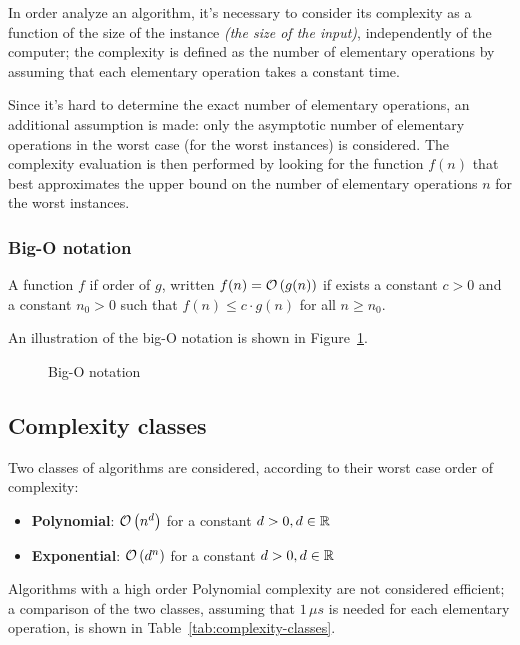 \documentclass[english]{article}
\begin{document}
In order analyze an algorithm, it's necessary to consider its complexity as a function of the size of the instance \textit{(the size of the input)}, independently of the computer;
the complexity is defined as the number of elementary operations by assuming that each elementary operation takes a constant time.

Since it's hard to determine the exact number of elementary operations, an additional assumption is made: only the asymptotic number of elementary operations in the worst case (for the worst instances) is considered.
The complexity evaluation is then performed by looking for the function \(f(n)\) that best approximates the upper bound on the number of elementary operations \(n\) for the worst instances.

\subsubsection{Big-O notation}

A function \(f\) if order of \(g\), written \(f(n) = \mathcal{O}\left(g(n)\right)\) if exists a constant \(c > 0\) and a constant \(n_0 > 0\) such that \(f(n) \leq c \cdot g(n)\) for all \(n \geq n_0\).

An illustration of the big-O notation is shown in Figure~\ref{fig:big-o-notation}.

\begin{figure}[htbp]
  \bigskip
  \centering
  \caption{Big-O notation}
  \label{fig:big-o-notation}
  \bigskip
\end{figure}

\subsection{Complexity classes}

Two classes of algorithms are considered, according to their worst case order of complexity:

\begin{itemize}
  \item \textbf{Polynomial}: \(\mathcal{O}\left(n^d\right)\) for a constant \(d > 0, d \in \mathbb{R}\)
  \item \textbf{Exponential}: \(\mathcal{O}\left(d^n\right)\) for a constant \(d > 0, d \in \mathbb{R}\)
\end{itemize}

Algorithms with a high order Polynomial complexity are not considered efficient;
a comparison of the two classes, assuming that \(1 \, \mu s\) is needed for each elementary operation, is shown in Table~\ref{tab:complexity-classes}.
\end{document}
